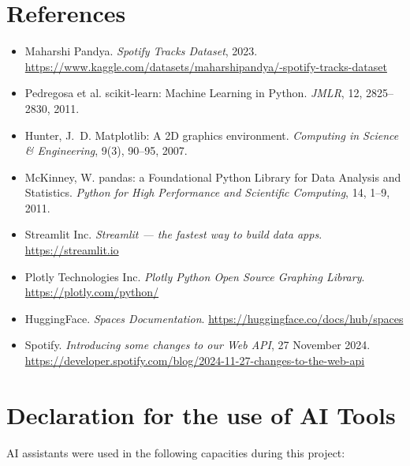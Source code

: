 \documentclass[11pt,a4paper]{article}
\begin{document}
\section{References}

\begin{itemize}
  \item Maharshi Pandya. \emph{Spotify Tracks Dataset}, 2023.\\
        \url{https://www.kaggle.com/datasets/maharshipandya/-spotify-tracks-dataset}
  \item Pedregosa et al. scikit-learn: Machine Learning in Python.
        \emph{JMLR}, 12, 2825--2830, 2011.
  \item Hunter, J.~D. Matplotlib: A 2D graphics environment.
        \emph{Computing in Science \& Engineering}, 9(3), 90--95, 2007.
  \item McKinney, W. pandas: a Foundational Python Library for Data
        Analysis and Statistics. \emph{Python for High Performance and
        Scientific Computing}, 14, 1--9, 2011.
  \item Streamlit Inc. \emph{Streamlit --- the fastest way to build
        data apps}. \url{https://streamlit.io}
  \item Plotly Technologies Inc. \emph{Plotly Python Open Source
        Graphing Library}. \url{https://plotly.com/python/}
  \item HuggingFace. \emph{Spaces Documentation}.
        \url{https://huggingface.co/docs/hub/spaces}
  \item Spotify. \emph{Introducing some changes to our Web API}, 27
        November 2024.
        \url{https://developer.spotify.com/blog/2024-11-27-changes-to-the-web-api}
\end{itemize}

\section{Declaration for the use of AI Tools}

AI assistants were used in the following capacities during this
project:
\end{document}
